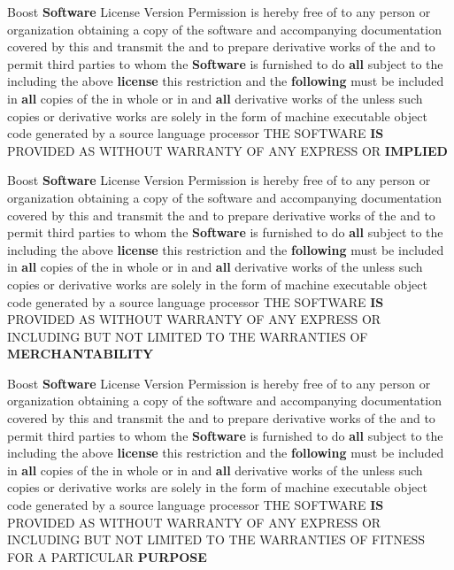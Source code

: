 \begin{DoxyCompactItemize}
\item 
Boost {\bf Software} License Version Permission is hereby free of to any person or organization obtaining a copy of the software and accompanying documentation covered by this and transmit the and to prepare derivative works of the and to permit third parties to whom the {\bf Software} is furnished to do {\bf all} subject to the including the above {\bf license} this restriction and the {\bf following} must be included in {\bf all} copies of the in whole or in and {\bf all} derivative works of the unless such copies or derivative works are solely in the form of machine executable object code generated by a source language processor T\+HE S\+O\+F\+T\+W\+A\+RE {\bf IS} P\+R\+O\+V\+I\+D\+ED AS W\+I\+T\+H\+O\+UT W\+A\+R\+R\+A\+N\+TY OF A\+NY E\+X\+P\+R\+E\+SS OR {\bf I\+M\+P\+L\+I\+ED}
\item 
Boost {\bf Software} License Version Permission is hereby free of to any person or organization obtaining a copy of the software and accompanying documentation covered by this and transmit the and to prepare derivative works of the and to permit third parties to whom the {\bf Software} is furnished to do {\bf all} subject to the including the above {\bf license} this restriction and the {\bf following} must be included in {\bf all} copies of the in whole or in and {\bf all} derivative works of the unless such copies or derivative works are solely in the form of machine executable object code generated by a source language processor T\+HE S\+O\+F\+T\+W\+A\+RE {\bf IS} P\+R\+O\+V\+I\+D\+ED AS W\+I\+T\+H\+O\+UT W\+A\+R\+R\+A\+N\+TY OF A\+NY E\+X\+P\+R\+E\+SS OR I\+N\+C\+L\+U\+D\+I\+NG B\+UT N\+OT L\+I\+M\+I\+T\+ED TO T\+HE W\+A\+R\+R\+A\+N\+T\+I\+ES OF {\bf M\+E\+R\+C\+H\+A\+N\+T\+A\+B\+I\+L\+I\+TY}
\item 
Boost {\bf Software} License Version Permission is hereby free of to any person or organization obtaining a copy of the software and accompanying documentation covered by this and transmit the and to prepare derivative works of the and to permit third parties to whom the {\bf Software} is furnished to do {\bf all} subject to the including the above {\bf license} this restriction and the {\bf following} must be included in {\bf all} copies of the in whole or in and {\bf all} derivative works of the unless such copies or derivative works are solely in the form of machine executable object code generated by a source language processor T\+HE S\+O\+F\+T\+W\+A\+RE {\bf IS} P\+R\+O\+V\+I\+D\+ED AS W\+I\+T\+H\+O\+UT W\+A\+R\+R\+A\+N\+TY OF A\+NY E\+X\+P\+R\+E\+SS OR I\+N\+C\+L\+U\+D\+I\+NG B\+UT N\+OT L\+I\+M\+I\+T\+ED TO T\+HE W\+A\+R\+R\+A\+N\+T\+I\+ES OF F\+I\+T\+N\+E\+SS F\+OR A P\+A\+R\+T\+I\+C\+U\+L\+AR {\bf P\+U\+R\+P\+O\+SE}

\end{DoxyCompactItemize}
